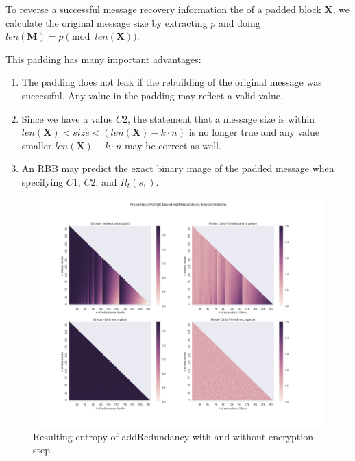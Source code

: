 \documentclass[acmsmall, screen, final, natbib=false]{acmart}
\begin{document}
	To reverse a successful message recovery information the of a padded block $\mathbf{X}$, we calculate the original message size by extracting $p$ and doing $len(\mathbf{M})=p \pmod{ len(\mathbf{X})}$.
	
	This padding has many important advantages:
	\begin{enumerate}
		\item The padding does not leak if the rebuilding of the original message was successful. Any value in the padding may reflect a valid value.
		\item Since we have a value $C2$, the statement that a message size is within $len(\mathbf{X})<size<(len(\mathbf{X})-k\cdot n)$ is no longer true and any value smaller $len(\mathbf{X})-k\cdot n$ may be correct as well.
		\item An RBB may predict the exact binary image of the padded message when specifying $C1$, $C2$, and $R_{t}(s,)$.
	\end{enumerate}
	
	\begin{figure}[ht]\centering
		\includegraphics[width=1\columnwidth]{randomblock_10kb}
		\caption{Resulting entropy of addRedundancy with and without encryption step}
		\label{fig:entropy}
	\end{figure}
	
\end{document}
